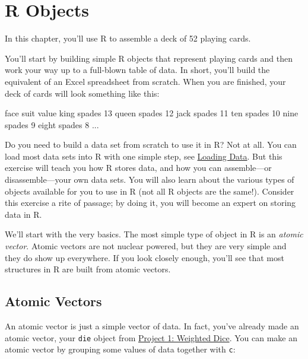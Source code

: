 \documentclass[
  letterpaper,
  DIV=11,
  numbers=noendperiod]{scrbook}
\newenvironment{Shaded}{\begin{snugshade}}{\end{snugshade}}
\newcommand{\DecValTok}[1]{\textcolor[rgb]{0.68,0.00,0.00}{#1}}
\newcommand{\NormalTok}[1]{\textcolor[rgb]{0.00,0.23,0.31}{#1}}
\begin{document}
\chapter{R Objects}\label{sec-r-objects}

In this chapter, you'll use R to assemble a deck of 52 playing cards.

You'll start by building simple R objects that represent playing cards
and then work your way up to a full-blown table of data. In short,
you'll build the equivalent of an Excel spreadsheet from scratch. When
you are finished, your deck of cards will look something like this:

\begin{Shaded}
\begin{Highlighting}[]
\NormalTok{ face   suit value}
\NormalTok{ king spades    }\DecValTok{13}
\NormalTok{queen spades    }\DecValTok{12}
\NormalTok{ jack spades    }\DecValTok{11}
\NormalTok{  ten spades    }\DecValTok{10}
\NormalTok{ nine spades     }\DecValTok{9}
\NormalTok{eight spades     }\DecValTok{8}
\NormalTok{...}
\end{Highlighting}
\end{Shaded}

Do you need to build a data set from scratch to use it in R? Not at all.
You can load most data sets into R with one simple step, see
\hyperref[sec-loading-data]{Loading Data}. But this exercise will teach
you how R stores data, and how you can assemble---or disassemble---your
own data sets. You will also learn about the various types of objects
available for you to use in R (not all R objects are the same!).
Consider this exercise a rite of passage; by doing it, you will become
an expert on storing data in R.

We'll start with the very basics. The most simple type of object in R is
an \emph{atomic vector}. Atomic vectors are not nuclear powered, but
they are very simple and they do show up everywhere. If you look closely
enough, you'll see that most structures in R are built from atomic
vectors.

\section{Atomic Vectors}\label{atomic-vectors}

An atomic vector is just a simple vector of data. In fact, you've
already made an atomic vector, your \texttt{die} object from
\hyperref[sec-project-dice]{Project 1: Weighted Dice}. You can make an
atomic vector by grouping some values of data together with \texttt{c}:
\end{document}
